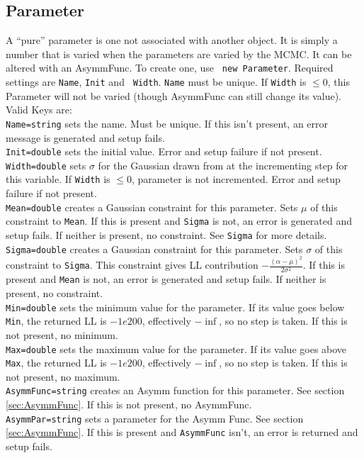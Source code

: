 \subsection{Parameter}
\label{sec:Parameter}
A ``pure'' parameter is one not associated with another object.  It is
simply a number that is varied when the parameters are varied by the
MCMC.  It can be altered with an AsymmFunc.  To create one, use {\tt
new Parameter}.  Required settings are {\tt Name}, {\tt Init} and {\tt
Width}.  {\tt Name} must be unique.  If {\tt Width} is $\leq 0$, this
Parameter will not be varied (though AsymmFunc can still change its
value).  Valid Keys are:\medskip\\ 
\verb|Name=string| sets the name.  Must be unique.  If this isn't
present, an error message is generated and setup fails. \medskip\\
\verb|Init=double| sets the initial value.  Error and setup failure if
not present.\medskip\\
\verb|Width=double| sets $\sigma$ for the Gaussian drawn from at the
incrementing step for this variable.  If \verb|Width| is $\leq 0$,
parameter is not incremented.  Error and setup failure if not
present.\medskip\\
\verb|Mean=double| creates a Gaussian constraint for this parameter.
Sets $\mu$ of this constraint to \verb|Mean|.  If this is present and
\verb|Sigma| is not, an error is generated and setup fails.  If
neither is present, no constraint.  See \verb|Sigma| for more
details.\medskip\\
\verb|Sigma=double| creates a Gaussian constraint
for this parameter.  Sets $\sigma$ of this constraint to \verb|Sigma|.
This constraint gives LL contribution $\displaystyle
-\frac{(\alpha-\mu)^2}{2 \sigma^2}$.  If this is present and
\verb|Mean| is not, an error is generated and setup fails.  If neither
is present, no constraint.\medskip\\
\verb|Min=double| sets the minimum value for the parameter.  If its
value goes below \verb|Min|, the returned LL is $-1e200$, effectively
$-\inf$, so no step is taken.  If this is not present, no
minimum.\medskip\\
\verb|Max=double| sets the maximum value for the parameter.  If its
value goes above \verb|Max|, the returned LL is $-1e200$, effectively
$-\inf$, so no step is taken.  If this is not present, no
maximum.\medskip\\
\verb|AsymmFunc=string| creates an Asymm function for this parameter.
See section \ref{sec:AsymmFunc}.  If this is not present, no
AsymmFunc.\medskip\\
\verb|AsymmPar=string| sets a parameter for the Asymm Func.  See
section \ref{sec:AsymmFunc}.  If this is present and \verb|AsymmFunc|
isn't, an error is returned and setup fails.

